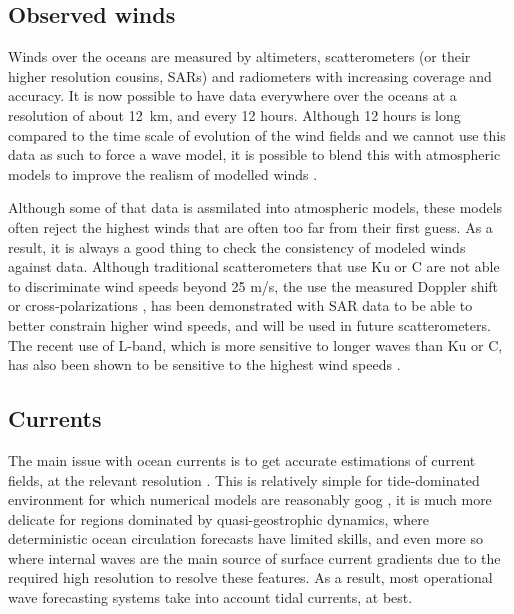 \subsection{Observed winds}
Winds over the oceans are measured by altimeters, scatterometers (or their higher resolution cousins, SARs) and radiometers with increasing 
coverage and accuracy. It is now possible to have data everywhere over the oceans at a resolution of about 12~km, and every 12 hours. 
Although 12 hours is long compared to the time scale of evolution of the wind fields and we cannot use this data as such to force a wave model, 
it is possible to blend this with atmospheric models to improve the realism of modelled winds \citep[e.g.][]{Bentamy&al.2007}. 

Although some of that data is assmilated into atmospheric models, these models often reject the highest winds that are often too far from their 
first guess. As a result, it is always a good thing to check the consistency of modeled winds against data. Although traditional scatterometers that use Ku or C 
are not able to discriminate wind speeds beyond 25 m/s, the use the measured Doppler shift \citep{Mouche&al.2012} or cross-polarizations \citep{Vachon&Wolfe2011,Mouche&Chapron2015}, 
has been demonstrated with SAR data to be able to better constrain higher wind speeds, and will be used in future scatterometers. The recent use of L-band, which is more 
sensitive to longer waves than Ku or C, has also been shown to be sensitive to the highest wind speeds \citep{Reul&al.2012}. 

\subsection{Currents}
The main issue with ocean currents is to get accurate estimations of current fields, at the relevant resolution \citep{Ardhuin&al.2017a}. This is relatively simple for tide-dominated environment 
for which numerical models are reasonably goog \citep[e.g.][]{Ardhuin&al.2012}, it is much more delicate for regions dominated by quasi-geostrophic dynamics, where 
deterministic ocean circulation forecasts have limited skills, 
and even more so where internal waves are the main source of surface current gradients \citep{Osborne&Burch1980} due to the required high resolution to resolve these 
features.  As a result, most operational wave forecasting systems take into account tidal currents, at best. 

